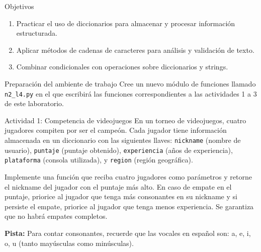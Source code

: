 \documentclass{ip-lab}
\begin{document}
\maketitle

\begin{sectionbox}{Objetivos}
\begin{enumerate}
    \item Practicar el uso de diccionarios para almacenar y procesar información estructurada.
    \item Aplicar métodos de cadenas de caracteres para análisis y validación de texto.
    \item Combinar condicionales con operaciones sobre diccionarios y strings.
\end{enumerate}
\end{sectionbox}

\begin{sectionbox}{Preparación del ambiente de trabajo}
  Cree un nuevo módulo de funciones llamado \texttt{n2\_l4.py} en el que escribirá las funciones correspondientes a las actividades 1 a 3 de este laboratorio.
\end{sectionbox}

\begin{sectionbox}{Actividad 1: Competencia de videojuegos}
En un torneo de videojuegos, cuatro jugadores compiten por ser el campeón. Cada jugador tiene información almacenada en un diccionario con las siguientes llaves: \texttt{\textquotedbl nickname\textquotedbl} (nombre de usuario), \texttt{\textquotedbl puntaje\textquotedbl} (puntaje obtenido), \texttt{\textquotedbl experiencia\textquotedbl} (años de experiencia), \texttt{\textquotedbl plataforma\textquotedbl} (consola utilizada), y \texttt{\textquotedbl region\textquotedbl} (región geográfica).

Implemente una función que reciba cuatro jugadores como parámetros y retorne el nickname del jugador con el puntaje más alto. En caso de empate en el puntaje, priorice al jugador que tenga más consonantes en su nickname y si persiste el empate, priorice al jugador que tenga menos experiencia. Se garantiza que no habrá empates completos.

\textbf{Pista:} Para contar consonantes, recuerde que las vocales en español son: a, e, i, o, u (tanto mayúsculas como minúsculas).
\end{sectionbox}

\pagebreak
\end{document}
